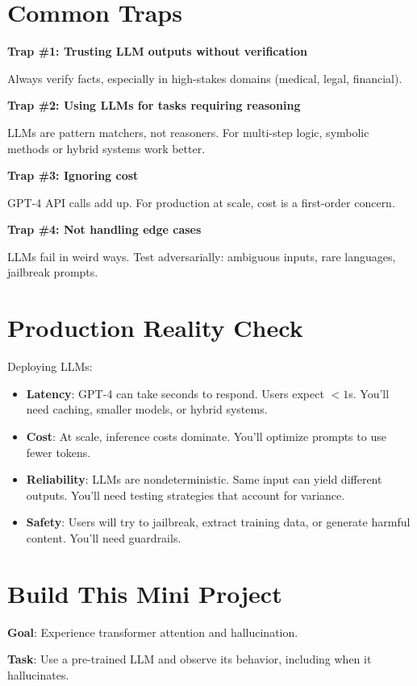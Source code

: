 \section{Common Traps}

\textbf{Trap \#1: Trusting LLM outputs without verification}

Always verify facts, especially in high-stakes domains (medical, legal, financial).

\textbf{Trap \#2: Using LLMs for tasks requiring reasoning}

LLMs are pattern matchers, not reasoners. For multi-step logic, symbolic methods or hybrid systems work better.

\textbf{Trap \#3: Ignoring cost}

GPT-4 API calls add up. For production at scale, cost is a first-order concern.

\textbf{Trap \#4: Not handling edge cases}

LLMs fail in weird ways. Test adversarially: ambiguous inputs, rare languages, jailbreak prompts.

\section{Production Reality Check}

Deploying LLMs:

\begin{itemize}
\item \textbf{Latency}: GPT-4 can take seconds to respond. Users expect $<1$s. You'll need caching, smaller models, or hybrid systems.
\item \textbf{Cost}: At scale, inference costs dominate. You'll optimize prompts to use fewer tokens.
\item \textbf{Reliability}: LLMs are nondeterministic. Same input can yield different outputs. You'll need testing strategies that account for variance.
\item \textbf{Safety}: Users will try to jailbreak, extract training data, or generate harmful content. You'll need guardrails.
\end{itemize}

\section{Build This Mini Project}

\textbf{Goal}: Experience transformer attention and hallucination.

\textbf{Task}: Use a pre-trained LLM and observe its behavior, including when it hallucinates.

